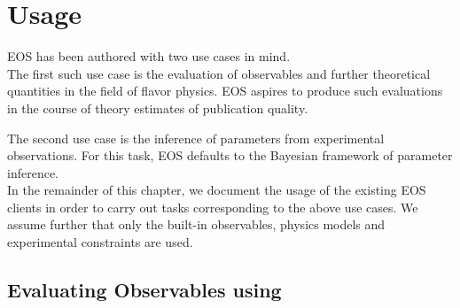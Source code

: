 
\chapter{Usage}
\label{ch:usage}

EOS has been authored with two use cases in mind.\\

The first such use case is the evaluation of observables and further theoretical
quantities in the field of flavor physics. EOS aspires to produce such evaluations
in the course of theory estimates of publication quality.

The second use case is the inference of parameters from experimental observations.
For this task, EOS defaults to the Bayesian framework of parameter inference.\\

In the remainder of this chapter, we document the usage of the existing
EOS clients in order to carry out tasks corresponding to the above use cases.
We assume further that only the built-in observables, physics models and experimental
constraints are used.

\section{Evaluating Observables using }
\label{sec:usage:eos-evaluate}


